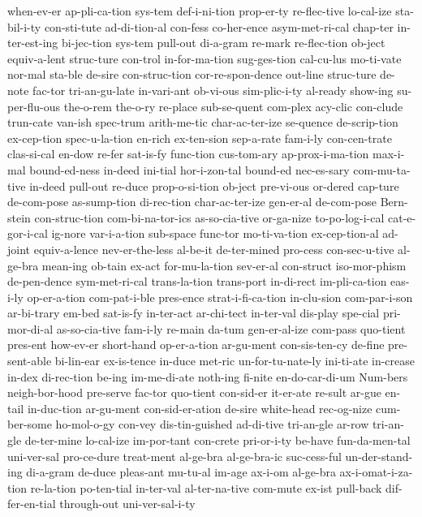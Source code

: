 {when-ev-er
ap-pli-ca-tion
sys-tem
def-i-ni-tion
prop-er-ty
re-flec-tive
lo-cal-ize
sta-bil-i-ty
con-sti-tute
ad-di-tion-al
con-fess
co-her-ence
asym-met-ri-cal
chap-ter
in-ter-est-ing
bi-jec-tion
sys-tem
pull-out
di-a-gram
re-mark
re-flec-tion
ob-ject
equiv-a-lent
struc-ture
con-trol
in-for-ma-tion
sug-ges-tion
cal-cu-lus
mo-ti-vate
nor-mal
sta-ble
de-sire
con-struc-tion
cor-re-spon-dence
out-line
struc-ture
de-note
fac-tor
tri-an-gu-late
in-vari-ant
ob-vi-ous
sim-plic-i-ty
al-ready
show-ing
su-per-flu-ous
the-o-rem
the-o-ry
re-place
sub-se-quent
com-plex
acy-clic
con-clude
trun-cate
van-ish
spec-trum
arith-me-tic
char-ac-ter-ize
se-quence
de-scrip-tion
ex-cep-tion
spec-u-la-tion
en-rich
ex-ten-sion
sep-a-rate
fam-i-ly
con-cen-trate
clas-si-cal
en-dow
re-fer
sat-is-fy
func-tion
cus-tom-ary
ap-prox-i-ma-tion
max-i-mal
bound-ed-ness
in-deed
ini-tial
hor-i-zon-tal
bound-ed
nec-es-sary
com-mu-ta-tive
in-deed
pull-out
re-duce
prop-o-si-tion
ob-ject
pre-vi-ous
or-dered
cap-ture
de-com-pose
as-sump-tion
di-rec-tion
char-ac-ter-ize
gen-er-al
de-com-pose
Bern-stein
con-struc-tion
com-bi-na-tor-ics
as-so-cia-tive
or-ga-nize
to-po-log-i-cal
cat-e-gor-i-cal
ig-nore
var-i-a-tion
sub-space
func-tor
mo-ti-va-tion
ex-cep-tion-al
ad-joint
equiv-a-lence
nev-er-the-less
al-be-it
de-ter-mined
pro-cess
con-sec-u-tive
al-ge-bra
mean-ing
ob-tain
ex-act
for-mu-la-tion
sev-er-al
con-struct
iso-mor-phism
de-pen-dence
sym-met-ri-cal
trans-la-tion
trans-port
in-di-rect
im-pli-ca-tion
eas-i-ly
op-er-a-tion
com-pat-i-ble
pres-ence
strat-i-fi-ca-tion
in-clu-sion
com-par-i-son
ar-bi-trary
em-bed
sat-is-fy
in-ter-act
ar-chi-tect
in-ter-val
dis-play
spe-cial
pri-mor-di-al
as-so-cia-tive
fam-i-ly
re-main
da-tum
gen-er-al-ize
com-pass
quo-tient
pres-ent
how-ev-er
short-hand
op-er-a-tion
ar-gu-ment
con-sis-ten-cy
de-fine
pre-sent-able
bi-lin-ear
ex-is-tence
in-duce
met-ric
un-for-tu-nate-ly
ini-ti-ate
in-crease
in-dex
di-rec-tion
be-ing
im-me-di-ate
noth-ing
fi-nite
en-do-car-di-um
Num-bers
neigh-bor-hood
pre-serve
fac-tor
quo-tient
con-sid-er
it-er-ate
re-sult
ar-gue
en-tail
in-duc-tion
ar-gu-ment
con-sid-er-ation
de-sire
white-head
rec-og-nize
cum-ber-some
ho-mol-o-gy
con-vey
dis-tin-guished
ad-di-tive
tri-an-gle
ar-row
tri-an-gle
de-ter-mine
lo-cal-ize
im-por-tant
con-crete
pri-or-i-ty
be-have
fun-da-men-tal
uni-ver-sal
pro-ce-dure
treat-ment
al-ge-bra
al-ge-bra-ic
suc-cess-ful
un-der-stand-ing
di-a-gram
de-duce
pleas-ant
mu-tu-al
im-age
ax-i-om
al-ge-bra
ax-i-omat-i-za-tion
re-la-tion
po-ten-tial
in-ter-val
al-ter-na-tive
com-mute
ex-ist
pull-back
dif-fer-en-tial
through-out
uni-ver-sal-i-ty
}
